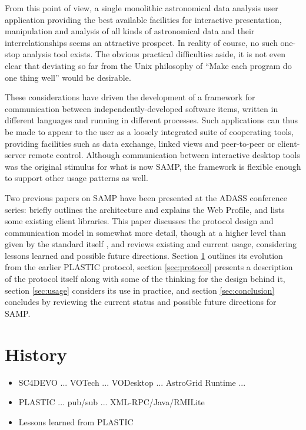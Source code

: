 \documentclass[5p]{elsarticle}
\newcommand{\todo}{\color{gray}}
\begin{document}
From this point of view, a single monolithic astronomical data analysis
user application providing the best available facilities for
interactive presentation, manipulation and analysis of all kinds of
astronomical data and their interrelationships seems an attractive prospect.
In reality of course, no such one-stop analysis tool exists.
The obvious practical difficulties aside, it is not even clear
that deviating so far from the Unix philosophy of
``Make each program do one thing well'' \citep{mcilroy1978}
would be desirable.

These considerations have driven the development of a framework
for communication between independently-developed software items,
written in different languages and running in different processes.
Such applications can thus be made to appear to the user
as a loosely integrated suite of cooperating tools,
providing facilities such as data exchange, linked views and
peer-to-peer or client-server remote control.
Although communication between interactive desktop tools was the
original stimulus for what is now SAMP, the framework is flexible
enough to support other usage patterns as well.

Two previous papers on SAMP have been presented at the ADASS conference
series:
\citet{adassxxi_paper} briefly outlines the architecture and explains
the Web Profile, and \citet{adassxxii_bof} lists some existing
client libraries.
This paper discusses the protocol design and communication model
in somewhat more detail, though at a higher level than given by the
standard itself \citep{samp_std}, and reviews existing and current
usage, considering lessons learned and possible future directions.
Section \ref{sec:history} outlines its evolution from
the earlier PLASTIC protocol,
section \ref{sec:protocol} presents a description of the protocol itself
along with some of the thinking for the design behind it,
section \ref{sec:usage} considers its use in practice, and
section \ref{sec:conclusion} concludes by reviewing the current status
and possible future directions for SAMP.

{\todo
\section{History} \label{sec:history}
 
  \begin{itemize}
  \item SC4DEVO ... VOTech ... VODesktop ... AstroGrid Runtime ...
  \item PLASTIC\citep{plastic_note} ... pub/sub ... XML-RPC/Java/RMILite
  \item Lessons learned from PLASTIC
  \end{itemize}
}
\end{document}
